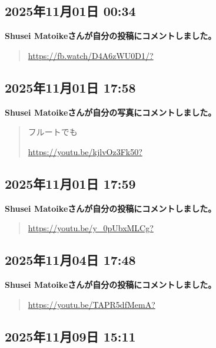 \subsection*{2025年11月01日 00:34}

\textbf{Shusei Matoikeさんが自分の投稿にコメントしました。}

\begin{quote}
\url{https://fb.watch/D4A6zWU0D1/?}
\end{quote}

\subsection*{2025年11月01日 17:58}

\textbf{Shusei Matoikeさんが自分の写真にコメントしました。}

\begin{quote}
フルートでも

\url{https://youtu.be/kjlvOz3Fk50?}
\end{quote}

\subsection*{2025年11月01日 17:59}

\textbf{Shusei Matoikeさんが自分の投稿にコメントしました。}

\begin{quote}
\url{https://youtu.be/y_0pUbxMLCg?}
\end{quote}

\subsection*{2025年11月04日 17:48}

\textbf{Shusei Matoikeさんが自分の投稿にコメントしました。}

\begin{quote}
\url{https://youtu.be/TAPR5dfMemA?}
\end{quote}

\subsection*{2025年11月09日 15:11}


